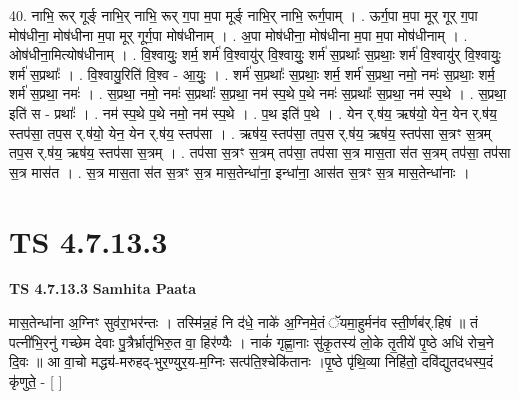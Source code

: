 \documentclass[17pt]{extarticle}
\begin{document}
40. नाभि॒ रूर् गूर्ङ् नाभि॒र् नाभि॒ रूर् ग॒पा म॒पा मूर्ङ् नाभि॒र् नाभि॒ रूर्ग॒पाम् । . ऊर्ग॒पा म॒पा मूर् गूर् ग॒पा मोष॑धीना॒ मोष॑धीना म॒पा मूर् गूर्ग॒पा मोष॑धीनाम् । . अ॒पा मोष॑धीना॒ मोष॑धीना म॒पा म॒पा मोष॑धीनाम् । . ओष॑धीना॒मित्योष॑धीनाम् । . वि॒श्वायुः॒ शर्म॒ शर्म॑ वि॒श्वायु॑र् वि॒श्वायुः॒ शर्म॑ स॒प्रथाः᳚ स॒प्रथाः॒ शर्म॑ वि॒श्वायु॑र् वि॒श्वायुः॒ शर्म॑ स॒प्रथाः᳚ । . वि॒श्वायु॒रिति॑ वि॒श्व - आ॒युः॒ । . शर्म॑ स॒प्रथाः᳚ स॒प्रथाः॒ शर्म॒ शर्म॑ स॒प्रथा॒ नमो॒ नमः॑ स॒प्रथाः॒ शर्म॒ शर्म॑ स॒प्रथा॒ नमः॑ । . स॒प्रथा॒ नमो॒ नमः॑ स॒प्रथाः᳚ स॒प्रथा॒ नम॑ स्प॒थे प॒थे नमः॑ स॒प्रथाः᳚ स॒प्रथा॒ नम॑ स्प॒थे । . स॒प्रथा॒ इति॑ स - प्रथाः᳚ । . नम॑ स्प॒थे प॒थे नमो॒ नम॑ स्प॒थे । . प॒थ इति॑ प॒थे । . येन र्.ष॑य॒ ऋष॑यो॒ येन॒ येन र्.ष॑य॒ स्तप॑सा॒ तप॒स र्.ष॑यो॒ येन॒ येन र्.ष॑य॒ स्तप॑सा । . ऋष॑य॒ स्तप॑सा॒ तप॒स र्.ष॑य॒ ऋष॑य॒ स्तप॑सा स॒त्रꣳ स॒त्रम् तप॒स र्.ष॑य॒ ऋष॑य॒ स्तप॑सा स॒त्रम् । . तप॑सा स॒त्रꣳ स॒त्रम् तप॑सा॒ तप॑सा स॒त्र मास॒ता स॑त स॒त्रम् तप॑सा॒ तप॑सा स॒त्र मास॑त । . स॒त्र मास॒ता स॑त स॒त्रꣳ स॒त्र मास॒तेन्धा॑ना॒ इन्धा॑ना॒ आस॑त स॒त्रꣳ स॒त्र मास॒तेन्धा॑नाः । \newline
\pagebreak
{}

\section{ TS 4.7.13.3 }

\textbf{TS 4.7.13.3 } \newline
\textbf{Samhita Paata} \newline

मास॒तेन्धा॑ना अ॒ग्निꣳ सुव॑रा॒भर॑न्तः । तस्मि॑न्न॒हं नि द॑धे॒ नाके॑ अ॒ग्निमे॒तं ॅयमा॒हुर्मन॑व स्ती॒र्णब॑र्.हिषं ॥ तं पत्नी॑भि॒रनु॑ गच्छेम देवाः पु॒त्रैर्भ्रातृ॑भिरु॒त वा॒ हिर॑ण्यैः । नाकं॑ गृह्णा॒नाः सु॑कृ॒तस्य॑ लो॒के तृ॒तीये॑ पृ॒ष्ठे अधि॑ रोच॒ने दि॒वः ॥ आ वा॒चो मद्ध्य॑-मरुहद्-भुर॒ण्युर॒य-म॒ग्निः सत्प॑ति॒श्चेकि॑तानः ।पृ॒ष्ठे पृ॑थि॒व्या निहि॑तो॒ दवि॑द्युतदधस्प॒दं कृ॑णुते॒ - [  ] \newline
\end{document}
